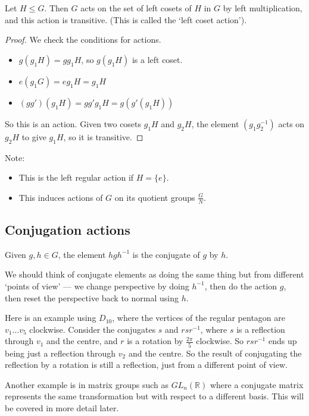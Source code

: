 \begin{proposition}
	Let \(H \leq G\).
	Then \(G\) acts on the set of left cosets of \(H\) in \(G\) by left multiplication, and this action is transitive.
	(This is called the `left coset action').
\end{proposition}
\begin{proof}
	We check the conditions for actions.
	\begin{itemize}
		\item \(g(g_1H) = gg_1H\), so \(g(g_1H)\) is a left coset.
		\item \(e(g_1G) = eg_1H = g_1H\)
		\item \((gg')(g_1H) = gg'g_1H = g(g'(g_1H))\)
	\end{itemize}
	So this is an action.
	Given two cosets \(g_1H\) and \(g_2H\), the element \((g_1g_2^{-1})\) acts on \(g_2H\) to give \(g_1H\), so it is transitive.
\end{proof}
Note:
\begin{itemize}
	\item This is the left regular action if \(H = \{ e \}\).
	\item This induces actions of \(G\) on its quotient groups \(\frac{G}{N}\).
\end{itemize}

\subsection{Conjugation actions}
\begin{definition}
	Given \(g, h \in G\), the element \(hgh^{-1}\) is the conjugate of \(g\) by \(h\).
\end{definition}
We should think of conjugate elements as doing the same thing but from different `points of view' --- we change perspective by doing \(h^{-1}\), then do the action \(g\), then reset the perspective back to normal using \(h\).

Here is an example using \(D_{10}\), where the vertices of the regular pentagon are \(v_1 \dots v_5\) clockwise.
Consider the conjugates \(s\) and \(rsr^{-1}\), where \(s\) is a reflection through \(v_1\) and the centre, and \(r\) is a rotation by \(\frac{2\pi}{5}\) clockwise.
So \(rsr^{-1}\) ends up being just a reflection through \(v_2\) and the centre.
So the result of conjugating the reflection by a rotation is still a reflection, just from a different point of view.

Another example is in matrix groups such as \(GL_n(\mathbb R)\) where a conjugate matrix represents the same transformation but with respect to a different basis.
This will be covered in more detail later.

